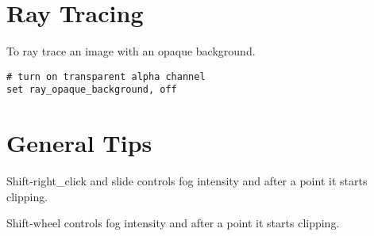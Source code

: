 \documentclass[10pt, oneside, pdftex]{article}
\begin{document}
\section*{Ray Tracing}
To ray trace an image with an opaque background.
\begin{Verbatim}
# turn on transparent alpha channel
set ray_opaque_background, off
\end{Verbatim}

\section*{General Tips}
Shift-right\_click and slide controls fog intensity and after a point
it starts clipping.

\noindent Shift-wheel controls fog intensity and after a point it starts
clipping. 
\end{document}
